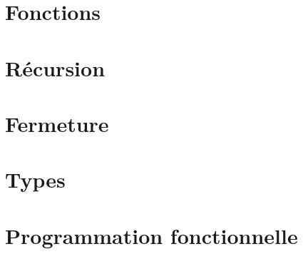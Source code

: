 \documentclass[10pt]{scrreprt}
\begin{document}








\chapter{Fonctions}









\chapter{Récursion}


\chapter{Fermeture}




\chapter{Types}







\chapter{Programmation fonctionnelle}










\end{document}
